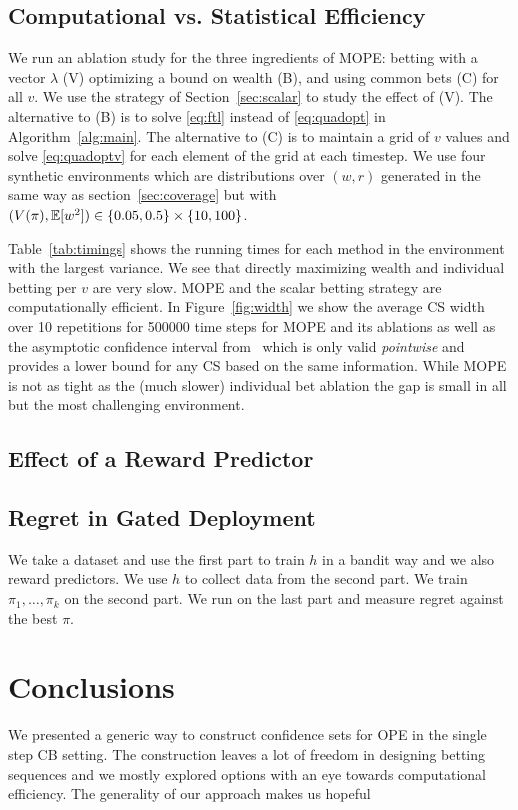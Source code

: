 \subsection{Computational vs. Statistical Efficiency}
We run an ablation study for the three ingredients of MOPE:
betting with a vector $\lambda$ (V)
optimizing a bound on wealth (B), 
and using common bets (C) for all $v$. We use 
the strategy of Section~\ref{sec:scalar} to study
the effect of (V). The alternative to (B) is to 
solve \eqref{eq:ftl} instead of \eqref{eq:quadopt} in
Algorithm~\ref{alg:main}.
The alternative to (C) is to maintain a 
grid of $v$ values and solve
\eqref{eq:quadoptv} for each element of the grid
at each timestep. We use four synthetic environments
which are distributions over $(w,r)$ generated in the same way as section~\ref{sec:coverage} but
with $(V(\pi),\mathbb{E}[w^2]) \in \{0.05, 0.5\} \times \{10, 100\}$.

Table~\ref{tab:timings}
shows the running times for each method in the environment with 
the largest variance. We see that directly 
maximizing wealth and individual betting per $v$ are very slow.
MOPE and the scalar betting strategy are computationally efficient.
In Figure~\ref{fig:width} we show the 
average CS width over 10 repetitions for 500000 time steps
for MOPE and its ablations as well as the 
asymptotic confidence interval from~\cite{karampatziakis2019empirical}
which is only valid \emph{pointwise} and provides a lower bound for 
any CS based on the same information. While MOPE is not as tight as
the (much slower) individual bet ablation the gap is small in all 
but the most challenging environment.

\subsection{Effect of a Reward Predictor}

\subsection{Regret in Gated Deployment}
We take a dataset and use the first part to train $h$ in a 
bandit way and we also reward predictors. We use 
$h$ to collect data from the second part. We train
$\pi_1,\ldots, \pi_k$ on the second part. We run 
on the last part and measure regret against the
best $\pi$. 

\section{Conclusions}
We presented a generic way to construct confidence sets for OPE in the single
step CB setting. The construction leaves a lot of freedom in designing betting
sequences and we mostly explored options with an eye towards computational
efficiency. The generality of our approach makes us hopeful 

